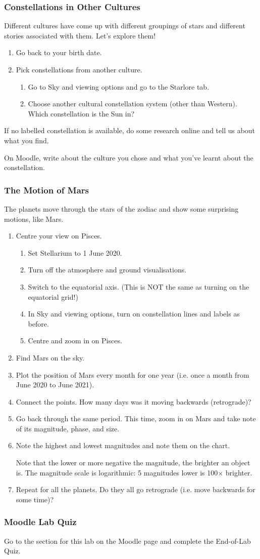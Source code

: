 \documentclass[main.tex]{subfiles}
\begin{document}
\subsubsection{Constellations in Other Cultures}
Different cultures have come up with different groupings of stars and different stories associated with them. Let's explore them!
\begin{enumerate}
\item Go back to your birth date.
\item Pick constellations from another culture.
	\begin{enumerate}
	\item Go to Sky and viewing options and go to the Starlore tab.
	\item Choose another cultural constellation system (other than Western). Which constellation is the Sun in?
	\end{enumerate}
\end{enumerate}
If no labelled constellation is available, do some research online and tell us about what you find.

On Moodle, write about the culture you chose and what you've learnt about the constellation.

\subsubsection{The Motion of Mars}
The planets move through the stars of the zodiac and show some surprising motions, like Mars.
\begin{enumerate}
\item Centre your view on Pisces.
	\begin{enumerate}
	\item Set Stellarium to 1 June 2020.
	\item Turn off the atmosphere and ground visualisations.
	\item Switch to the equatorial axis. (This is NOT the same as turning on the equatorial grid!)
	\item In Sky and viewing options, turn on constellation lines and labels as before.
	\item Centre and zoom in on Pisces.
	\end{enumerate}
\item Find Mars on the sky.
\item Plot the position of Mars every month for one year (i.e. once a month from June 2020 to June 2021).
\item Connect the points. How many days was it moving backwards (retrograde)?
\item Go back through the same period. This time, zoom in on Mars and take note of its magnitude, phase, and size.
\item Note the highest and lowest magnitudes and note them on the chart.

Note that the lower or more negative the magnitude, the brighter an object is. The magnitude scale is logarithmic: 5 magnitudes lower is 100$\times$ brighter.
\item Repeat for all the planets. Do they all go retrograde (i.e. move backwards for some time)?
\end{enumerate}

\subsubsection{Moodle Lab Quiz}
Go to the section for this lab on the Moodle page and complete the End-of-Lab Quiz.
\end{document}
